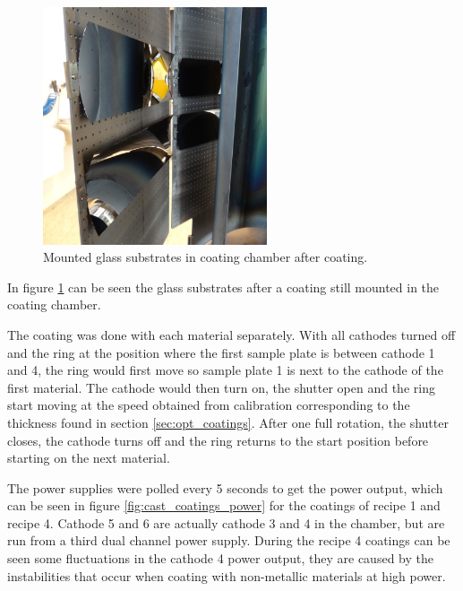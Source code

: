 \begin{figure}[htbp]
  \centering
    \includegraphics[height=7cm]{figures/cast/coated_pieces.jpg}
  \caption{\footnotesize Mounted glass substrates in coating chamber after coating. }
  \label{fig:coated_pieces}
\end{figure}

In figure \ref{fig:coated_pieces} can be seen the glass substrates after a coating still mounted in the coating chamber.

The coating was done with each material separately. With all cathodes turned off and the ring at the position where the first sample plate is between cathode 1 and 4, the ring would first move so sample plate 1 is next to the cathode of the first material. The cathode would then turn on, the shutter open and the ring start moving at the speed obtained from calibration corresponding to the thickness found in section \ref{sec:opt_coatings}. After one full rotation, the shutter closes, the cathode turns off and the ring returns to the start position before starting on the next material.

The power supplies were polled every 5 seconds to get the power output, which can be seen in figure \ref{fig:cast_coatings_power} for the coatings of recipe 1 and recipe 4. Cathode 5 and 6 are actually cathode 3 and 4 in the chamber, but are run from a third dual channel power supply. During the recipe 4 coatings can be seen some fluctuations in the cathode 4 power output, they are caused by the  instabilities that occur when coating with non-metallic materials at high power.

